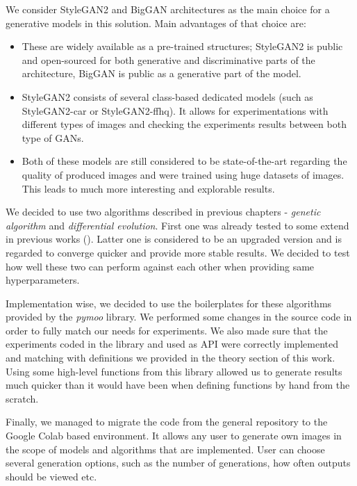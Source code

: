\documentclass[12pt,a4paper,openany]{book}
\begin{document}
We consider StyleGAN2 and BigGAN architectures as the main choice for a generative models in this solution. Main advantages of that choice are:
\begin{itemize}
\item These are widely available as a pre-trained structures; StyleGAN2 is public and open-sourced for both generative and discriminative parts of the architecture, BigGAN is public as a generative part of the model. 
\item StyleGAN2 consists of several class-based dedicated models (such as StyleGAN2-car or StyleGAN2-ffhq). It allows for experimentations with different types of images and checking the experiments results between both type of GANs.
\item Both of these models are still considered to be state-of-the-art regarding the quality of produced images and were trained using huge datasets of images. This leads to much more interesting and explorable results.
\end{itemize}

\noindent We decided to use two algorithms described in previous chapters - \textit{genetic algorithm} and \textit{differential evolution}. First one was already tested to some extend in previous works (\cite{coimbra}). Latter one is considered to be an upgraded version and is regarded to converge quicker and provide more stable results. We decided to test how well these two can perform against each other when providing same hyperparameters.

\noindent Implementation wise, we decided to use the boilerplates for these algorithms provided by the \textit{pymoo} library. We performed some changes in the source code in order to fully match our needs for experiments. We also made sure that the experiments coded in the library and used as API were correctly implemented and matching with definitions we provided in the theory section of this work. Using some high-level functions from this library allowed us to generate results much quicker than it would have been when defining functions by hand from the scratch.

\noindent Finally, we managed to migrate the code from the general repository to the Google Colab based environment. It allows any user to generate own images in the scope of models and algorithms that are implemented. User can choose several generation options, such as the number of generations, how often outputs should be viewed etc.
\end{document}
